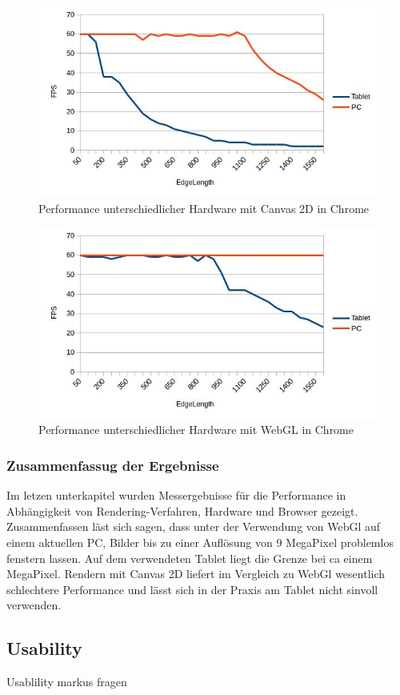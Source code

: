 \begin{figure}[pt]
	\centering
	\includegraphics[width=0.7\linewidth]{img/c4_stat_hardware_js_chrome.jpg}
	\caption{Performance unterschiedlicher Hardware mit Canvas 2D in Chrome}
	\label{fig:stat_hardware_js_chrome}
\end{figure}

\begin{figure}[pt]
	\centering
	\includegraphics[width=0.7\linewidth]{img/c4_stat_hardware_webgl_chrome.jpg}
	\caption{Performance unterschiedlicher Hardware mit WebGL in Chrome}
	\label{fig:stat_hardware_webgl_chrome}
\end{figure}

\subsubsection{Zusammenfassug der Ergebnisse}
Im letzen unterkapitel wurden Messergebnisse für die Performance in Abhängigkeit von Rendering-Verfahren, Hardware und Browser gezeigt.
Zusammenfassen läst sich sagen, 
dass unter der Verwendung von WebGl auf einem aktuellen PC, 
Bilder bis zu einer Auflösung von 9 MegaPixel problemlos fenstern lassen.
Auf dem verwendeten Tablet liegt die Grenze bei ca einem MegaPixel.
Rendern mit Canvas 2D liefert im Vergleich zu WebGl wesentlich schlechtere Performance und lässt sich in der Praxis am Tablet nicht sinvoll verwenden.


\subsection{Usability}
\label{sec:Usability}
Usablility
markus fragen
